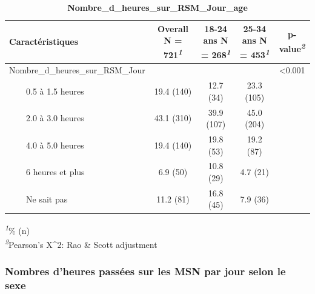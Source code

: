 \documentclass[
]{article}
\begin{document}
\begin{table}[!t]
\caption{\label{tab:unnamed-chunk-51}\textbf{Nombre\_d\_heures\_sur\_RSM\_Jour\_age}} 
\fontsize{12.0pt}{14.4pt}\selectfont
\begin{tabular*}{\linewidth}{@{\extracolsep{\fill}}lcccc}
\toprule
\textbf{Caractéristiques} & \textbf{Overall}  N = 721\textsuperscript{\textit{1}} & \textbf{18-24 ans}  N = 268\textsuperscript{\textit{1}} & \textbf{25-34 ans}  N = 453\textsuperscript{\textit{1}} & \textbf{p-value}\textsuperscript{\textit{2}} \\ 
\midrule\addlinespace[2.5pt]
Nombre\_d\_heures\_sur\_RSM\_Jour &  &  &  & <0.001 \\ 
    0.5 à 1.5 heures & 19.4 (140) & 12.7 (34) & 23.3 (105) &  \\ 
    2.0 à 3.0 heures & 43.1 (310) & 39.9 (107) & 45.0 (204) &  \\ 
    4.0 à 5.0 heures & 19.4 (140) & 19.8 (53) & 19.2 (87) &  \\ 
    6 heures et plus & 6.9 (50) & 10.8 (29) & 4.7 (21) &  \\ 
    Ne sait pas & 11.2 (81) & 16.8 (45) & 7.9 (36) &  \\ 
\bottomrule
\end{tabular*}
\begin{minipage}{\linewidth}
\textsuperscript{\textit{1}}\% (n)\\
\textsuperscript{\textit{2}}Pearson's X\^{}2: Rao \& Scott adjustment\\
\end{minipage}
\end{table}

\hypertarget{nombres-dheures-passuxe9es-sur-les-msn-par-jour-selon-le-sexe}{%
\subsubsection{Nombres d'heures passées sur les MSN par jour selon le
sexe}\label{nombres-dheures-passuxe9es-sur-les-msn-par-jour-selon-le-sexe}}
\end{document}
